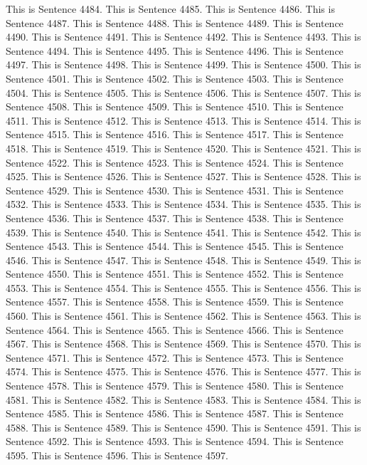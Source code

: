 \documentclass{article}
\begin{document}
This is Sentence 4484.
This is Sentence 4485.
This is Sentence 4486.
This is Sentence 4487.
This is Sentence 4488.
This is Sentence 4489.
This is Sentence 4490.
This is Sentence 4491.
This is Sentence 4492.
This is Sentence 4493.
This is Sentence 4494.
This is Sentence 4495.
This is Sentence 4496.
This is Sentence 4497.
This is Sentence 4498.
This is Sentence 4499.
This is Sentence 4500.
This is Sentence 4501.
This is Sentence 4502.
This is Sentence 4503.
This is Sentence 4504.
This is Sentence 4505.
This is Sentence 4506.
This is Sentence 4507.
This is Sentence 4508.
This is Sentence 4509.
This is Sentence 4510.
This is Sentence 4511.
This is Sentence 4512.
This is Sentence 4513.
This is Sentence 4514.
This is Sentence 4515.
This is Sentence 4516.
This is Sentence 4517.
This is Sentence 4518.
This is Sentence 4519.
This is Sentence 4520.
This is Sentence 4521.
This is Sentence 4522.
This is Sentence 4523.
This is Sentence 4524.
This is Sentence 4525.
This is Sentence 4526.
This is Sentence 4527.
This is Sentence 4528.
This is Sentence 4529.
This is Sentence 4530.
This is Sentence 4531.
This is Sentence 4532.
This is Sentence 4533.
This is Sentence 4534.
This is Sentence 4535.
This is Sentence 4536.
This is Sentence 4537.
This is Sentence 4538.
This is Sentence 4539.
This is Sentence 4540.
This is Sentence 4541.
This is Sentence 4542.
This is Sentence 4543.
This is Sentence 4544.
This is Sentence 4545.
This is Sentence 4546.
This is Sentence 4547.
This is Sentence 4548.
This is Sentence 4549.
This is Sentence 4550.
This is Sentence 4551.
This is Sentence 4552.
This is Sentence 4553.
This is Sentence 4554.
This is Sentence 4555.
This is Sentence 4556.
This is Sentence 4557.
This is Sentence 4558.
This is Sentence 4559.
This is Sentence 4560.
This is Sentence 4561.
This is Sentence 4562.
This is Sentence 4563.
This is Sentence 4564.
This is Sentence 4565.
This is Sentence 4566.
This is Sentence 4567.
This is Sentence 4568.
This is Sentence 4569.
This is Sentence 4570.
This is Sentence 4571.
This is Sentence 4572.
This is Sentence 4573.
This is Sentence 4574.
This is Sentence 4575.
This is Sentence 4576.
This is Sentence 4577.
This is Sentence 4578.
This is Sentence 4579.
This is Sentence 4580.
This is Sentence 4581.
This is Sentence 4582.
This is Sentence 4583.
This is Sentence 4584.
This is Sentence 4585.
This is Sentence 4586.
This is Sentence 4587.
This is Sentence 4588.
This is Sentence 4589.
This is Sentence 4590.
This is Sentence 4591.
This is Sentence 4592.
This is Sentence 4593.
This is Sentence 4594.
This is Sentence 4595.
This is Sentence 4596.
This is Sentence 4597.
\end{document}

